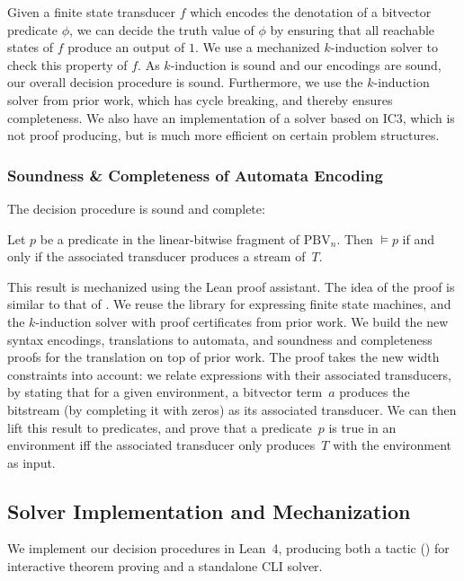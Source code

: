 Given a finite state transducer $f$ which encodes the denotation of a bitvector predicate $\phi$,
we can decide the truth value of $\phi$ by ensuring that all reachable states of $f$ produce an output of $1$.
We use a mechanized $k$-induction solver to check this property of $f$.
As $k$-induction is sound and our encodings are sound, our overall decision procedure is sound.
Furthermore, we use the $k$-induction solver from prior work, which has cycle breaking, and thereby ensures completeness.
We also have an implementation of a solver based on IC3,
which is not proof producing, but is much more efficient on certain problem structures.


\subsubsection{Soundness \& Completeness of Automata Encoding}

The decision procedure is sound and complete:
\begin{theorem}
  Let $p$ be a predicate in the linear-bitwise fragment of $\text{PBV}_n$.
  Then $\vDash p$ if and only if the associated transducer produces a stream
  of~$T$.
\end{theorem}
%
\noindent
This result is mechanized using the Lean proof assistant. The idea of the proof
is similar to that of \citet{bhat2025certified}. We reuse the library for expressing finite state machines,
and the $k$-induction solver with proof certificates from prior work.
We build the new syntax encodings, translations to automata, and soundness and completeness proofs for the translation on top of prior work.
The proof takes the new width constraints into account: we relate expressions with their associated
transducers, by stating that for a given environment, a bitvector term~$a$
produces the bitstream (by completing it with zeros) as its associated
transducer.
%
We can then lift this result to predicates, and prove that a predicate~$p$ is
true in an environment iff the associated transducer only produces~$T$ with the
environment as input.

\subsection{Solver Implementation and Mechanization}
\label{sec:mwbv:implementation}

We implement our decision procedures in Lean~4, producing
both a tactic (\ourtactic{}) for interactive theorem proving and a standalone CLI solver.

